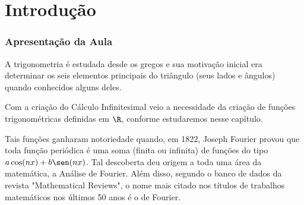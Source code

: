 \section{Introdução}

\begin{frame} \frametitle{Apresentação da Aula}

A trigonometria é estudada desde os gregos e sua motivação inicial
era determinar os seis elementos principais do triângulo (seus lados
e ângulos) quando conhecidos alguns deles.

Com a criação do Cálculo Infinitesimal veio a necessidade da criação
de funções trigonométricas definidas em $\R$, conforme estudaremos
nesse capítulo.

Tais funções ganharam notoriedade quando, em 1822, Joseph Fourier
provou que toda função periódica é uma soma (finita ou infinita) de
funções do tipo $a\cos (nx) +b \sen (nx)$. Tal descoberta deu origem
a toda uma área da matemática, a Análise de Fourier. Além disso,
segundo o banco de dados da revista "Mathematical Reviews", o nome
mais citado nos títulos de trabalhos matemáticos nos últimos 50 anos
é o de Fourier.

\end{frame}


